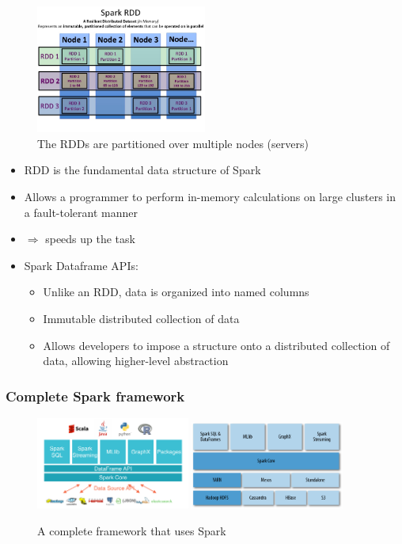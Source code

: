 \documentclass{article}
\begin{document}
\begin{figure}[H]
    \centering
    \includegraphics[width=0.5\textwidth]{spark-rdd.png}
    \caption{The RDDs are partitioned over multiple nodes (servers)}
\end{figure}

\begin{itemize}
    \item RDD is the fundamental data structure of Spark
    \item Allows a programmer to perform in-memory calculations on large clusters in a fault-tolerant manner
    \item $\Rightarrow$ speeds up the task
    \item Spark Dataframe APIs:
    \begin{itemize}
        \item Unlike an RDD, data is organized into named columns
        \item Immutable distributed collection of data
        \item Allows developers to impose a structure onto a distributed collection of data, allowing higher-level abstraction
    \end{itemize}
\end{itemize}

\subsubsection{Complete Spark framework}

\begin{figure}[H]
    \centering
    \includegraphics[width=0.45\textwidth]{spark-completeframework.png}
    \includegraphics[width=0.45\textwidth]{spark-completeframework2.png}
    \caption{A complete framework that uses Spark}
\end{figure}
\end{document}
